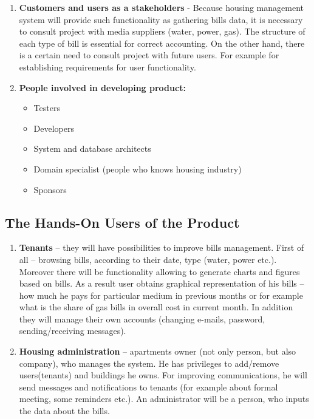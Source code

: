 \documentclass[a4paper,11pt,onecolumn,oneside]{book}
\begin{document}
\begin{enumerate} 
\item \textbf{Customers and users as a stakeholders} - Because housing management system will provide such functionality as gathering bills data, it is necessary to consult project with media suppliers (water, power, gas). The structure of each type of bill is essential for correct  accounting.
On the other hand, there is a certain need to consult project with future users. For example for establishing requirements for user functionality.


\item \textbf{People involved in developing product:}
\begin{itemize}
	\item Testers
	\item Developers
	\item System and database architects
	\item Domain specialist (people who knows housing industry)
	\item Sponsors
\end{itemize}
\end{enumerate}

\subsection{The Hands-On Users of the Product}
\begin{enumerate}
	\item  \textbf{Tenants} –  they will have possibilities to improve bills management. First of all – browsing bills, according to their date, type (water, power etc.). Moreover there will be functionality allowing to generate charts and figures based on bills. As a result user obtains graphical representation of his bills – how much he pays for particular medium in previous months or for example what is the share of gas bills in overall cost in current month.
            	In addition they will manage their own accounts (changing e-mails, password, sending/receiving messages).

	\item  \textbf{Housing administration} – apartments owner (not only person, but also company), who manages the system. He has privileges to add/remove users(tenants) and buildings he owns. For improving communications, he will send messages and notifications to tenants (for example about formal meeting, some reminders etc.). An administrator will be a person, who inputs the data about the bills.
\end{enumerate}
\end{document}
